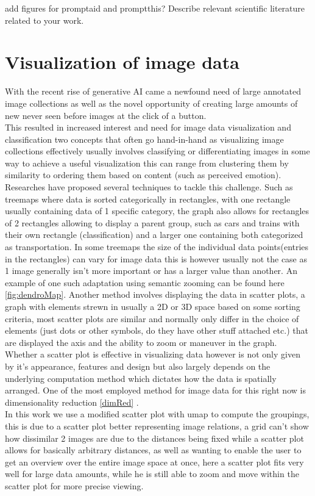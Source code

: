 \documentclass[
  a4paper,  %
  twoside,  %
  bibliography=totoc,
  headsepline,
  cleardoublepage=empty,
  parskip=half,
  draft=false
]{scrbook}
\begin{document}
add figures for promptaid and promptthis?
Describe relevant scientific literature related to your work.
\section{Visualization of image data}
With the recent rise of generative AI came a newfound need of large annotated image collections as well as the novel opportunity of creating large amounts of new never seen before images at the click of a button.\\This resulted in increased interest and need for image data visualization and classification two concepts that often go hand-in-hand as visualizing image collections effectively usually involves classifying or differentiating images in some way to achieve a useful visualization this can range from clustering them by similarity to ordering them based on content (such as perceived emotion). Researches have proposed several techniques to tackle this challenge. Such as treemaps where data is sorted categorically in rectangles, with one rectangle usually containing data of 1 specific category, the graph also allows for rectangles of 2 rectangles allowing to display a parent group, such as cars and trains with their own rectangle (classification) and a larger one containing both categorized as transportation. In some treemaps the size of the individual data points(entries in the rectangles) can vary for image data this is however usually not the case as 1 image generally isn't more important or has a larger value than another. An example of one such adaptation using semantic zooming can be found here \cite{dendromap} \cref{fig:dendroMap}.
 Another method involves displaying the data in scatter plots, a graph with elements strewn in usually a 2D or 3D  space based on some sorting criteria, most scatter plots are similar and normally only differ in the choice of elements (just dots or other symbols, do they have other stuff attached etc.) that are displayed the axis and the ability to zoom or maneuver in the graph. Whether a scatter plot is effective in visualizing data however is not only given by it's appearance, features and design but also largely depends on the underlying computation method which dictates how the data is spatially arranged. One of the most employed method for image data for this right now is dimensionality reduction \cref{dimRed} \cite{CDR,umap}.\\
 In this work we use a modified scatter plot with umap to compute the groupings, this is due to a scatter plot better representing image relations, a grid can't show how dissimilar 2 images are due to the distances being fixed while a scatter plot allows for basically arbitrary distances, as well as wanting to enable the user to get an overview over the entire image space at once, here a scatter plot fits very well for large data amounts, while he is still able to zoom and move within the scatter plot for more precise viewing. 
\end{document}
